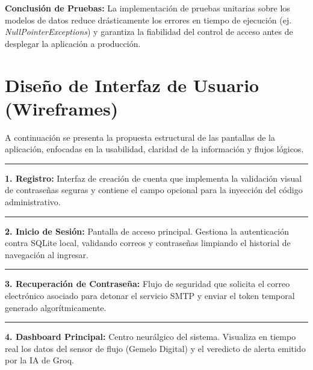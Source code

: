 \documentclass[11pt,a4paper]{article}
\begin{document}
\textbf{Conclusión de Pruebas:} La implementación de pruebas unitarias sobre los modelos de datos reduce drásticamente los errores en tiempo de ejecución (ej. \textit{NullPointerExceptions}) y garantiza la fiabilidad del control de acceso antes de desplegar la aplicación a producción.

\newpage
\section{Diseño de Interfaz de Usuario (Wireframes)}

A continuación se presenta la propuesta estructural de las pantallas de la aplicación, enfocadas en la usabilidad, claridad de la información y flujos lógicos.

\vspace{0.5cm}
\begin{center}
    \rule{6cm}{10cm}
\end{center}
\textbf{1. Registro:} Interfaz de creación de cuenta que implementa la validación visual de contraseñas seguras y contiene el campo opcional para la inyección del código administrativo.
\vspace{1cm}

\begin{center}
    \rule{6cm}{10cm}
\end{center}
\textbf{2. Inicio de Sesión:} Pantalla de acceso principal. Gestiona la autenticación contra SQLite local, validando correos y contraseñas limpiando el historial de navegación al ingresar.
\vspace{1cm}

\begin{center}
    \rule{6cm}{10cm}
\end{center}
\textbf{3. Recuperación de Contraseña:} Flujo de seguridad que solicita el correo electrónico asociado para detonar el servicio SMTP y enviar el token temporal generado algorítmicamente.
\newpage

\begin{center}
    \rule{6cm}{10cm}
\end{center}
\textbf{4. Dashboard Principal:} Centro neurálgico del sistema. Visualiza en tiempo real los datos del sensor de flujo (Gemelo Digital) y el veredicto de alerta emitido por la IA de Groq.
\vspace{1cm}
\end{document}
